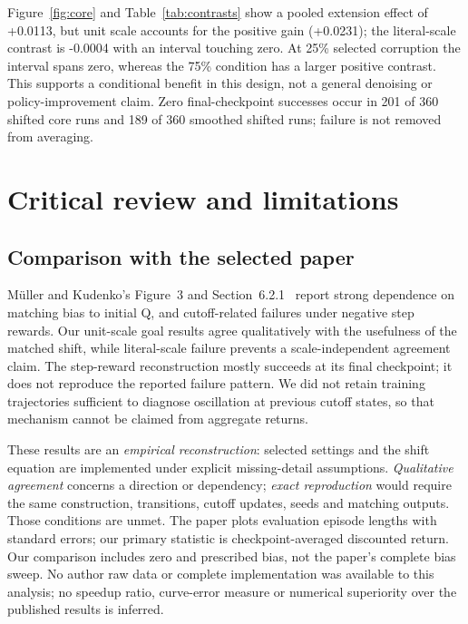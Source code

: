 \documentclass{COMPXXXX}
\begin{document}
Figure~\ref{fig:core} and Table~\ref{tab:contrasts} show a pooled extension effect of +0.0113, but unit scale accounts for the positive gain (+0.0231); the literal-scale contrast is -0.0004 with an interval touching zero. At 25\% selected corruption the interval spans zero, whereas the 75\% condition has a larger positive contrast. This supports a conditional benefit in this design, not a general denoising or policy-improvement claim. Zero final-checkpoint successes occur in 201 of 360 shifted core runs and 189 of 360 smoothed shifted runs; failure is not removed from averaging.

\section{Critical review and limitations}
\subsection{Comparison with the selected paper}
M{\"u}ller and Kudenko's Figure~3 and Section~6.2.1~\cite{mueller2025} report strong dependence on matching bias to initial Q, and cutoff-related failures under negative step rewards. Our unit-scale goal results agree qualitatively with the usefulness of the matched shift, while literal-scale failure prevents a scale-independent agreement claim. The step-reward reconstruction mostly succeeds at its final checkpoint; it does not reproduce the reported failure pattern. We did not retain training trajectories sufficient to diagnose oscillation at previous cutoff states, so that mechanism cannot be claimed from aggregate returns.

These results are an \emph{empirical reconstruction}: selected settings and the shift equation are implemented under explicit missing-detail assumptions. \emph{Qualitative agreement} concerns a direction or dependency; \emph{exact reproduction} would require the same construction, transitions, cutoff updates, seeds and matching outputs. Those conditions are unmet. The paper plots evaluation episode lengths with standard errors; our primary statistic is checkpoint-averaged discounted return. Our comparison includes zero and prescribed bias, not the paper's complete bias sweep. No author raw data or complete implementation was available to this analysis; no speedup ratio, curve-error measure or numerical superiority over the published results is inferred.
\end{document}
